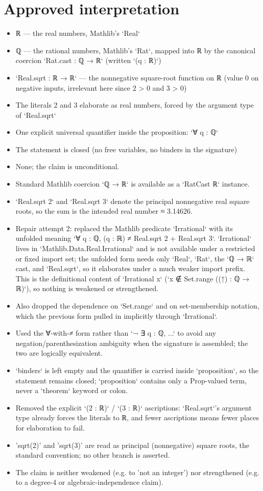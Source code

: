 \documentclass[11pt]{article}
\begin{document}
\section*{Approved interpretation}
\begin{itemize}
\item ℝ — the real numbers, Mathlib's `Real`
\item ℚ — the rational numbers, Mathlib's `Rat`, mapped into ℝ by the canonical coercion `Rat.cast : ℚ → ℝ` (written `(q : ℝ)`)
\item `Real.sqrt : ℝ → ℝ` — the nonnegative square-root function on ℝ (value 0 on negative inputs, irrelevant here since 2 > 0 and 3 > 0)
\item The literals 2 and 3 elaborate as real numbers, forced by the argument type of `Real.sqrt`
\item One explicit universal quantifier inside the proposition: `∀ q : ℚ`
\item The statement is closed (no free variables, no binders in the signature)
\item None; the claim is unconditional.
\item Standard Mathlib coercion `ℚ → ℝ` is available as a `RatCast ℝ` instance.
\item `Real.sqrt 2` and `Real.sqrt 3` denote the principal nonnegative real square roots, so the sum is the intended real number ≈ 3.14626.
\item Repair attempt 2: replaced the Mathlib predicate `Irrational` with its unfolded meaning `∀ q : ℚ, (q : ℝ) ≠ Real.sqrt 2 + Real.sqrt 3`. `Irrational` lives in `Mathlib.Data.Real.Irrational` and is not available under a restricted or fixed import set; the unfolded form needs only `Real`, `Rat`, the `ℚ → ℝ` cast, and `Real.sqrt`, so it elaborates under a much weaker import prefix. This is the definitional content of `Irrational x` (`x ∉ Set.range ((↑) : ℚ → ℝ)`), so nothing is weakened or strengthened.
\item Also dropped the dependence on `Set.range` and on set-membership notation, which the previous form pulled in implicitly through `Irrational`.
\item Used the ∀-with-≠ form rather than `¬ ∃ q : ℚ, ...` to avoid any negation/parenthesization ambiguity when the signature is assembled; the two are logically equivalent.
\item `binders` is left empty and the quantifier is carried inside `proposition`, so the statement remains closed; `proposition` contains only a Prop-valued term, never a `theorem` keyword or colon.
\item Removed the explicit `(2 : ℝ)` / `(3 : ℝ)` ascriptions: `Real.sqrt`'s argument type already forces the literals to ℝ, and fewer ascriptions means fewer places for elaboration to fail.
\item 'sqrt(2)' and 'sqrt(3)' are read as principal (nonnegative) square roots, the standard convention; no other branch is asserted.
\item The claim is neither weakened (e.g. to 'not an integer') nor strengthened (e.g. to a degree-4 or algebraic-independence claim).
\end{itemize}
\end{document}
